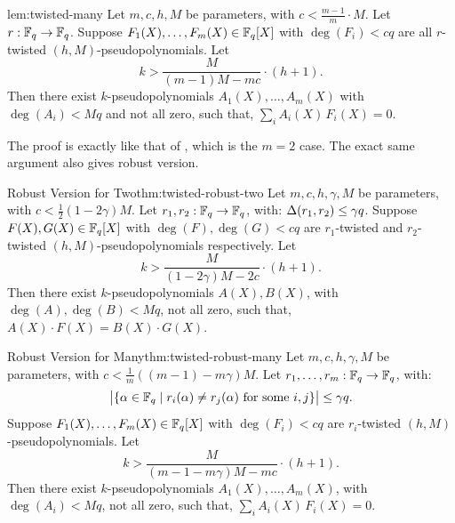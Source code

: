 \begin{lemma}{}{lem:twisted-many}
  Let $m, c, h, M$ be parameters, with $c < \frac{m-1}{m}\cdot M$. Let $r : \mathbb{F}_q \to \mathbb{F}_q$. Suppose $F_1(X), \ldots, F_m(X) \in \mathbb{F}_q[X]$ with $\deg(F_i) < cq$ are all $r$-twisted $(h, M)$-pseudopolynomials. Let $$k > \frac{M}{(m-1)M - mc} \cdot (h + 1).$$ Then there exist $k$-pseudopolynomials $A_1(X), \ldots, A_m(X)$ with $\deg(A_i) < Mq$ and not all zero, such that, $\sum_{i} A_i(X)\, F_i(X) = 0.$
\end{lemma}
The proof is exactly like that of , which is the $m = 2$ case. The exact same argument also gives robust version.

\begin{Theorem}{Robust Version for Two}{thm:twisted-robust-two}
    Let $m, c, h, \gamma, M$ be parameters, with $c < \frac12(1- 2\gamma)M$. Let $r_1,r_2: \mathbb{F}_q \to \mathbb{F}_q$, with: $\Delta(r_1,r_2)\leq \gamma q$. Suppose $F(X), G(X) \in \mathbb{F}_q[X]$ with $\deg(F),\deg(G) < cq$ are $r_1$-twisted and $r_2$-twisted $(h, M)$-pseudopolynomials respectively. Let $$k > \frac{M}{(1 - 2\gamma)M - 2c} \cdot (h + 1).$$ Then there exist $k$-pseudopolynomials $A(X),  B(X)$, with $\deg(A),\deg(B) < Mq$, not all zero, such that,  $A(X)\cdot F(X)=B(X)\cdot G(X)$.
\end{Theorem}

\begin{Theorem}{Robust Version for Many}{thm:twisted-robust-many}
  Let $m, c, h, \gamma, M$ be parameters, with $c < \frac1m((m-1) - m\gamma)M$. Let $r_1, \ldots, r_m : \mathbb{F}_q \to \mathbb{F}_q$, with:
  \[
    \bigl|\{\alpha \in \mathbb{F}_q \mid r_i(\alpha) \neq r_j(\alpha) \text{ for some } i, j\}\bigr| \leq \gamma q.
  \]
  Suppose $F_1(X), \ldots, F_m(X) \in \mathbb{F}_q[X]$ with $\deg(F_i) < cq$ are $r_i$-twisted $(h, M)$-pseudopolynomials. Let $$k > \frac{M}{(m - 1 - m\gamma)M - mc} \cdot (h + 1).$$ Then there exist $k$-pseudopolynomials $A_1(X), \ldots, A_m(X)$, with $\deg(A_i) < Mq$, not all zero, such that,  $\sum_{i} A_i(X)\, F_i(X) = 0$.
\end{Theorem}
